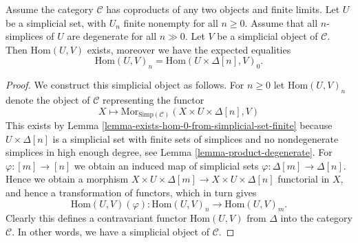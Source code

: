 \begin{lemma}
\label{lemma-exists-hom-from-simplicial-set-finite}
Assume the category $\mathcal{C}$
has coproducts of any two objects and finite
limits. Let $U$ be a simplicial set, with $U_n$ finite nonempty
for all $n \geq 0$. Assume that all $n$-simplices
of $U$ are degenerate for all $n \gg 0$.
Let $V$ be a simplicial object of $\mathcal{C}$.
Then $\text{Hom}(U, V)$ exists, moreover
we have the expected equalities
$$
\text{Hom}(U, V)_n = \text{Hom}(U \times \Delta[n], V)_0.
$$
\end{lemma}

\begin{proof}
We construct this simplicial object as follows.
For $n \geq 0$ let $\text{Hom}(U, V)_n$ denote
the object of $\mathcal{C}$ representing the
functor
$$
X
\longmapsto
\text{Mor}_{\text{Simp}(\mathcal{C})}(X \times U \times \Delta[n], V)
$$
This exists by Lemma \ref{lemma-exists-hom-0-from-simplicial-set-finite}
because $U \times \Delta[n]$ is a simplicial set with finite
sets of simplices and no nondegenerate simplices in high enough degree,
see Lemma \ref{lemma-product-degenerate}.
For $\varphi : [m] \to [n]$ we obtain an induced map of simplicial
sets $\varphi : \Delta[m] \to \Delta[n]$. Hence we obtain a morphism
$X \times U \times \Delta[m] \to X \times U \times \Delta[n]$
functorial in $X$, and hence a transformation of functors,
which in turn gives
$$
\text{Hom}(U, V)(\varphi) :
\text{Hom}(U, V)_n
\longrightarrow
\text{Hom}(U, V)_m.
$$
Clearly this defines a contravariant functor
$\text{Hom}(U, V)$ from
$\Delta$ into the category $\mathcal{C}$.
In other words, we have a simplicial object of $\mathcal{C}$.


\end{proof}
